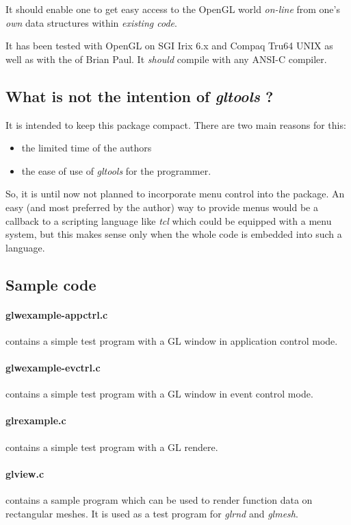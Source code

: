 \documentclass[a4paper]{article}
\begin{document}
It should enable one to get easy access to the   OpenGL world
{\em on-line}
from one's  {\em own} data structures within {\em existing code}.

It has been tested with OpenGL on SGI Irix 6.x and Compaq Tru64 UNIX 
as well as with the 
 of Brian Paul. It {\em should} 
compile with any ANSI-C compiler.

\subsection{What is not the intention of {\em gltools} ?}
It is intended to keep this package compact. 
There are two main reasons for this:
\begin{itemize}
\item the limited time of the authors 
\item the ease of use of {\em gltools} for the programmer.
\end{itemize}

So, it  is until now not planned  to incorporate menu control into the
package.  An easy  (and most preferred  by the author)  way to provide
menus would be a callback to a scripting language like {\em tcl} which
could be equipped with a  menu system, but this  makes sense only when
the whole code is embedded into such a language. 

\subsection{Sample code}
\paragraph{glwexample-appctrl.c} contains a simple test
program with a GL window in application control mode.

\paragraph{glwexample-evctrl.c} contains a simple test
program with a GL window in event control mode.

\paragraph{glrexample.c} contains a simple test
program with a GL rendere.

\paragraph*{glview.c} contains a sample program which can be used to render
function data on rectangular meshes. It is used as a test program
for {\em glrnd} and {\em glmesh}.
\end{document}
